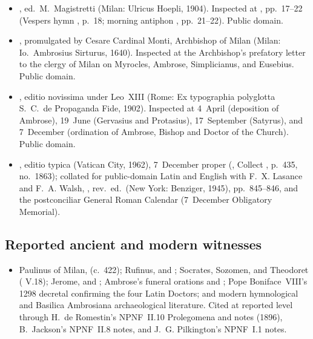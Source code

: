 \begin{itemize}
\item {}, ed.\ M.~Magistretti (Milan: Ulricus Hoepli, 1904). Inspected at , pp.~17--22 (Vespers hymn , p.~18; morning antiphon , pp.~21--22). Public domain.
\item {}, promulgated by Cesare Cardinal Monti, Archbishop of Milan (Milan: Io.\ Ambrosius Sirturus, 1640). Inspected at the Archbishop's prefatory letter to the clergy of Milan on Myrocles, Ambrose, Simplicianus, and Eusebius. Public domain.
\item {}, editio novissima under Leo~XIII (Rome: Ex typographia polyglotta S.~C.\ de Propaganda Fide, 1902). Inspected at 4~April (deposition of Ambrose), 19~June (Gervasius and Protasius), 17~September (Satyrus), and 7~December (ordination of Ambrose, Bishop and Doctor of the Church). Public domain.
\item {}, editio typica (Vatican City, 1962), 7~December proper (, Collect , p.~435, no.~1863); collated for public-domain Latin and English with F.~X. Lasance and F.~A. Walsh, , rev.\ ed.\ (New York: Benziger, 1945), pp.~845--846, and the postconciliar General Roman Calendar (7~December Obligatory Memorial).
\end{itemize}

\subsection*{Reported ancient and modern witnesses}

\begin{itemize}
\item Paulinus of Milan,  (c.~422); Rufinus,  and ; Socrates, Sozomen, and Theodoret ( V.18); Jerome,  and ; Ambrose's funeral orations  and ; Pope Boniface~VIII's 1298 decretal confirming the four Latin Doctors; and modern hymnological and Basilica Ambrosiana archaeological literature. Cited at reported level through H.~de Romestin's NPNF~II.10 Prolegomena and notes (1896), B.~Jackson's NPNF~II.8 notes, and J.~G. Pilkington's NPNF~I.1 notes.
\end{itemize}

\endgroup
